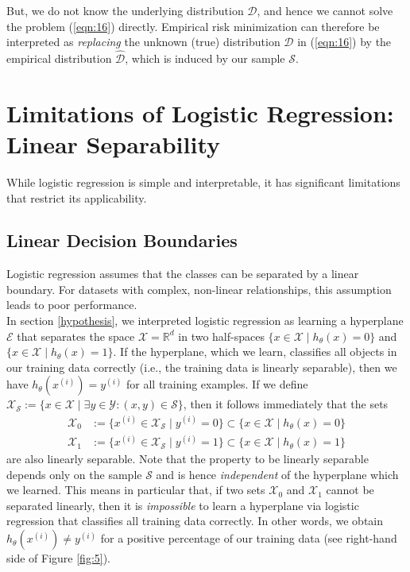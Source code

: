 But, we do not know the underlying distribution $\mathcal{D}$, and hence we cannot solve
the problem (\ref{eqn:16}) directly. Empirical risk minimization can therefore be interpreted as \emph{replacing} the unknown (true) distribution $\mathcal{D}$ in (\ref{eqn:16}) by the empirical distribution $\hat{\mathcal{D}}$, which is induced by our sample $\mathcal{S}$.


\section{Limitations of Logistic Regression: Linear Separability} \label{limitations}
While logistic regression is simple and interpretable, it has significant limitations that restrict its applicability.

\subsection{Linear Decision Boundaries}
Logistic regression assumes that the classes can be separated by a linear boundary. For datasets with complex, non-linear relationships, this assumption leads to poor performance.\\

In section \ref{hypothesis}, we interpreted logistic regression as learning a hyperplane $\mathcal{E}$ that separates the space $\mathcal{X} = \mathbb{R}^d$ in two half-spaces $\{x \in \mathcal{X}\mid h_{\theta}(x) =0 \}$ and $\{x \in \mathcal{X}\mid h_{\theta}(x) =1 \}$. If the hyperplane, which we learn, classifies all objects in our training data correctly (i.e., the training data is linearly separable), then we have $h_{\theta}(x^{(i)})=y^{(i)}$ for all training examples. If we define $\mathcal{X}_{\mathcal{S}} := \{x \in \mathcal{X}\mid \exists y \in \mathcal{Y} : (x,y) \in \mathcal{S} \}$, then it follows immediately that the sets
\begin{equation}
    \begin{aligned}
        \mathcal{X}_0 &:= \{x^{(i)} \in \mathcal{X}_{\mathcal{S}}\mid y^{(i)}=0 \} \subset \{x \in \mathcal{X}\mid h_{\theta}(x)=0 \}\\
        \mathcal{X}_1 &:= \{x^{(i)} \in \mathcal{X}_{\mathcal{S}}\mid y^{(i)}=1 \} \subset \{x \in \mathcal{X}\mid h_{\theta}(x)=1 \}
    \end{aligned}
    \label{eqn:17}
\end{equation}
are also linearly separable. Note that the property to be linearly separable depends only on the sample $\mathcal{S}$ and is hence \emph{independent} of the hyperplane which we learned. This means in particular that, if two sets $\mathcal{X}_0$ and $\mathcal{X}_1$ cannot be separated linearly, then it is \emph{impossible} to learn a hyperplane via
logistic regression that classifies all training data correctly. In other words, we obtain $h_{\theta}(x^{(i)}) \neq y^{(i)}$ for a positive percentage of our training data (see right-hand side of Figure \ref{fig:5}).



